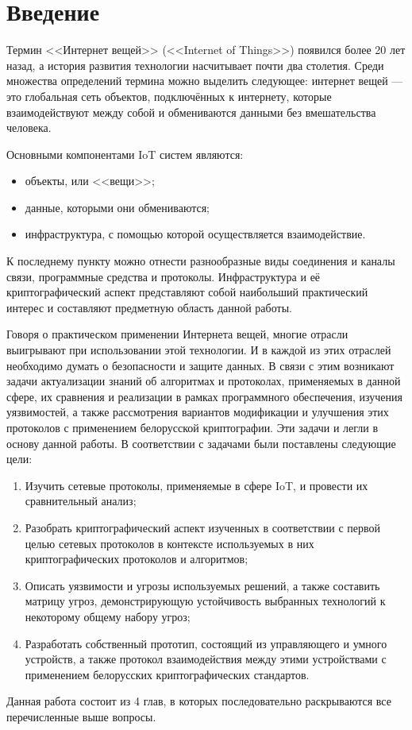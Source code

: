 \chapter*{Введение}
 
 	Термин <<Интернет вещей>> (<<Internet of Things>>) появился более 20 лет назад, а история развития
 	технологии насчитывает почти два столетия. Среди множества определений термина можно выделить
 	следующее: интернет вещей --- это глобальная сеть объектов, подключённых к интернету, которые 
 	взаимодействуют между собой и обмениваются данными без вмешательства человека.
 	
 	Основными компонентами IoT систем являются:
 	\begin{itemize}
 		\item объекты, или <<вещи>>;
 		\item данные, которыми они обмениваются;
 		\item инфраструктура, с помощью которой осуществляется взаимодействие.
 	\end{itemize}
 
 	К последнему пункту можно отнести разнообразные виды соединения и каналы связи, программные 
 	средства и протоколы. Инфраструктура и её криптографический аспект представляют собой наибольший
 	практический интерес и составляют предметную область данной работы.
 	
 	Говоря о практическом применении Интернета вещей, многие отрасли выигрывают при использовании
 	этой технологии. И в каждой из этих отраслей необходимо думать о безопасности и защите данных.
 	В связи с этим возникают задачи актуализации знаний об алгоритмах и протоколах, применяемых в
 	данной сфере, их сравнения и реализации в рамках программного обеспечения, 
 	изучения уязвимостей, а также рассмотрения
 	вариантов модификации и улучшения этих протоколов с применением белорусской криптографии. Эти
 	задачи и легли в основу данной работы. В соответствии с задачами были поставлены следующие цели:
 	
 	\begin{enumerate}
 		\item Изучить сетевые протоколы, применяемые в сфере IoT, и провести их сравнительный анализ;
 		\item Разобрать криптографический аспект изученных в соответствии с первой целью сетевых 
 		протоколов в контексте используемых в них криптографических протоколов и алгоритмов;
 		\item Описать уязвимости и угрозы используемых решений, а также составить матрицу угроз,
 		демонстрирующую устойчивость выбранных технологий к некоторому общему набору угроз;
 		\item Разработать собственный прототип, состоящий из управляющего и умного устройств,
 		а также протокол взаимодействия между этими устройствами с применением белорусских 
 		криптографических стандартов.
 	\end{enumerate}
 	
 	Данная работа состоит из 4 глав, в которых последовательно раскрываются все перечисленные выше
 	вопросы.